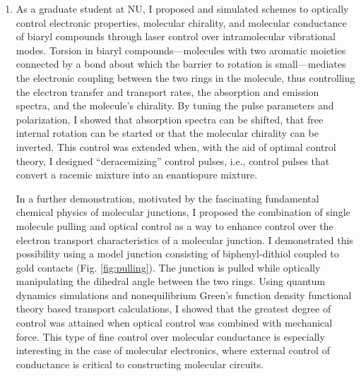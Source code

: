 \documentclass{nihbiosketch}
\begin{document}
\begin{enumerate}

% 
  \item
  As a graduate student at NU, I proposed and simulated schemes to optically control electronic
  properties, molecular chirality, and molecular conductance of biaryl compounds through laser control over
  intramolecular vibrational modes.\cite{Parker2011JCP}
  Torsion in biaryl compounds---molecules with two aromatic moieties connected by a bond about which the barrier
  to rotation is small---mediates the electronic coupling between the two rings in the molecule, thus controlling
  the electron transfer and transport rates, the absorption and emission spectra, and the
  molecule's chirality.
  By tuning the pulse parameters and
  polarization, I showed that absorption spectra can be shifted, that free internal rotation can be started or
  that the molecular chirality
  can be inverted. This control was extended when, with the aid of optimal control theory,
  I designed ``deracemizing'' control pulses, i.e., control
  pulses that convert a racemic mixture into an enantiopure mixture.\cite{Parker2012MolPhys}

  In a further demonstration, motivated by the fascinating fundamental chemical physics of molecular junctions,
  I proposed the combination of single molecule pulling and optical control as a way to enhance control over the
  electron transport characteristics of a molecular junction.\cite{Parker:2014kt} I demonstrated this possibility using a model junction
  consisting of biphenyl-dithiol coupled to gold contacts (Fig. \ref{fig:pulling}). The junction is pulled while optically
  manipulating the dihedral angle between the two rings. Using quantum dynamics simulations and nonequilibrium Green's function
  density functional theory based transport calculations, I showed
  that the greatest degree of control was attained when optical control was combined with
  mechanical force.
  This type of fine control over molecular conductance is especially interesting in the case of molecular electronics,
  where external control of conductance is critical to constructing molecular circuits.
  

\end{enumerate}
\end{document}
